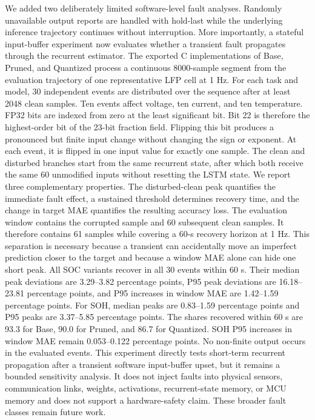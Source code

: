 {} We added two deliberately limited software-level fault analyses. Randomly unavailable output reports are handled with hold-last while the underlying inference trajectory continues without interruption. More importantly, a stateful input-buffer experiment now evaluates whether a transient fault propagates through the recurrent estimator. The exported C implementations of Base, Pruned, and Quantized process a continuous 8000-sample segment from the evaluation trajectory of one representative LFP cell at 1 Hz. For each task and model, 30 independent events are distributed over the sequence after at least 2048 clean samples. Ten events affect voltage, ten current, and ten temperature. FP32 bits are indexed from zero at the least significant bit. Bit 22 is therefore the highest-order bit of the 23-bit fraction field. Flipping this bit produces a pronounced but finite input change without changing the sign or exponent. At each event, it is flipped in one input value for exactly one sample. The clean and disturbed branches start from the same recurrent state, after which both receive the same 60 unmodified inputs without resetting the LSTM state.\markdownRendererParagraphSeparator
{}We report three complementary properties. The disturbed-clean peak quantifies the immediate fault effect, a sustained threshold determines recovery time, and the change in target MAE quantifies the resulting accuracy loss. The evaluation window contains the corrupted sample and 60 subsequent clean samples. It therefore contains 61 samples while covering a 60-s recovery horizon at 1 Hz. This separation is necessary because a transient can accidentally move an imperfect prediction closer to the target and because a window MAE alone can hide one short peak. All SOC variants recover in all 30 events within 60 s. Their median peak deviations are 3.29--3.82 percentage points, P95 peak deviations are 16.18--23.81 percentage points, and P95 increases in window MAE are 1.42--1.59 percentage points. For SOH, median peaks are 0.83--1.59 percentage points and P95 peaks are 3.37--5.85 percentage points. The shares recovered within 60 s are 93.3\markdownRendererPercentSign{} for Base, 90.0\markdownRendererPercentSign{} for Pruned, and 86.7\markdownRendererPercentSign{} for Quantized. SOH P95 increases in window MAE remain 0.053--0.122 percentage points. No non-finite output occurs in the evaluated events.\markdownRendererParagraphSeparator
{}This experiment directly tests short-term recurrent propagation after a transient software input-buffer upset, but it remains a bounded sensitivity analysis. It does not inject faults into physical sensors, communication links, weights, activations, recurrent-state memory, or MCU memory and does not support a hardware-safety claim. These broader fault classes remain future work.\markdownRendererParagraphSeparator
